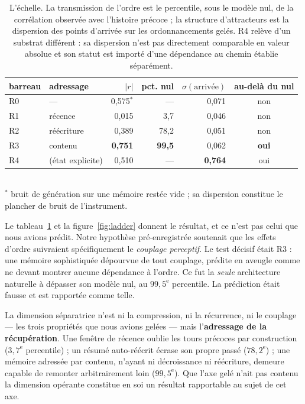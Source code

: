 \documentclass[11pt]{article}
\begin{document}
\begin{table}[t]
\centering\small
\caption{L'échelle. La transmission de l'ordre est le percentile, sous le modèle nul,
de la corrélation observée avec l'histoire précoce ; la structure d'attracteurs est la
dispersion des points d'arrivée sur les ordonnancements gelés. R4 relève d'un substrat
différent : sa dispersion n'est pas directement comparable en valeur absolue et son
statut est importé d'une dépendance au chemin établie séparément.}
\label{tab:ladder}
\begin{tabular}{@{}llrrrc@{}}
\toprule
barreau & adressage & $|r|$ & pct. nul & $\sigma(\text{arrivée})$ & au-delà du nul \\
\midrule
R0 & --- & 0,575$^{*}$ & --- & 0,071 & non \\
R1 & récence & 0,015 & 3,7 & 0,046 & non \\
R2 & réécriture & 0,389 & 78,2 & 0,051 & non \\
R3 & contenu & \textbf{0,751} & \textbf{99,5} & 0,062 & \textbf{oui} \\
R4 & (état explicite) & 0,510 & --- & \textbf{0,764} & oui \\
\bottomrule
\end{tabular}\\[0.3em]
{\footnotesize $^{*}$ bruit de génération sur une mémoire restée vide ; sa dispersion
constitue le plancher de bruit de l'instrument.}
\end{table}

Le tableau~\ref{tab:ladder} et la figure~\ref{fig:ladder} donnent le résultat, et ce
n'est pas celui que nous avions prédit. Notre hypothèse pré-enregistrée soutenait que
les effets d'ordre suivraient spécifiquement le \emph{couplage perceptif}. Le test
décisif était R3 : une mémoire sophistiquée dépourvue de tout couplage, prédite en
aveugle comme ne devant montrer aucune dépendance à l'ordre. Ce fut la \emph{seule}
architecture naturelle à dépasser son modèle nul, au $99{,}5^\text{e}$ percentile. La
prédiction était fausse et est rapportée comme telle.

La dimension séparatrice n'est ni la compression, ni la récurrence, ni le couplage
--- les trois propriétés que nous avions gelées --- mais l'\textbf{adressage de la
récupération}. Une fenêtre de récence oublie les tours précoces par construction
($3{,}7^\text{e}$ percentile) ; un résumé auto-réécrit écrase son propre passé
($78{,}2^\text{e}$) ; une mémoire adressée par contenu, n'ayant ni décroissance ni
réécriture, demeure capable de remonter arbitrairement loin ($99{,}5^\text{e}$). Que
l'axe gelé n'ait pas contenu la dimension opérante constitue en soi un résultat
rapportable au sujet de cet axe.
\end{document}
